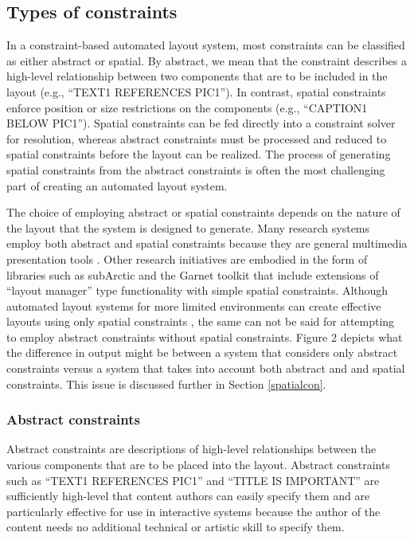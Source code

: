     \subsection{Types of constraints}

		In a constraint-based automated layout system, most constraints can be
		classified as either abstract or spatial. By abstract, we mean that the
		constraint describes a high-level relationship between two components that
		are to be included in the layout (e.g., “TEXT1 REFERENCES PIC1”). In
		contrast, spatial constraints enforce position or size restrictions on the
		components (e.g., “CAPTION1 BELOW PIC1”). Spatial constraints can be fed
		directly into a constraint solver for resolution, whereas abstract
		constraints must be processed and reduced to spatial constraints before the
		layout can be realized. The process of generating spatial constraints from
		the abstract constraints is often the most challenging part of creating an
		automated layout system.

		The choice of employing abstract or spatial constraints depends on the
		nature of the layout that the system is designed to generate. Many research
		systems employ both abstract and spatial constraints because they are
		general multimedia presentation tools \citep{feiner-1,weitzman-2,graf-1}.
		Other research initiatives are embodied in the form of libraries such as
		subArctic \citep{hudson-3,hudson-1} and the Garnet toolkit \citep{myers-2}
		that include extensions of “layout manager” type functionality with simple
		spatial constraints. Although automated layout systems for more limited
		environments can create effective layouts using only spatial constraints
		\citep{kosak-1}, the same can not be said for attempting to employ abstract
		constraints without spatial constraints. Figure 2 depicts what the
		difference in output might be between a system that considers only abstract
		constraints versus a system that takes into account both abstract and and
		spatial constraints. This issue is discussed further in Section
		\ref{spatialcon}.

    \subsubsection{Abstract constraints}

		Abstract constraints are descriptions of high-level relationships between
		the various components that are to be placed into the layout. Abstract
		constraints such as “TEXT1 REFERENCES PIC1” and “TITLE IS IMPORTANT” are
		sufficiently high-level that content authors can easily specify them and
		are particularly effective for use in interactive systems because the
		author of the content needs no additional technical or artistic skill to
		specify them.

